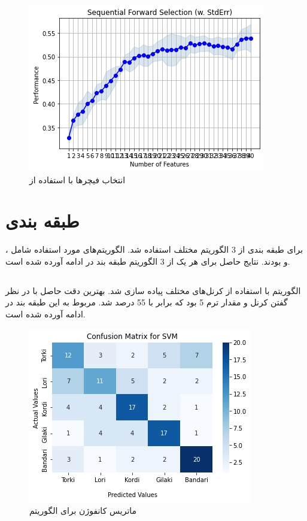 \begin{figure}[h!]
    \centering
    \includegraphics[width=0.75\linewidth]{images/feature_selection.png}
    \caption{انتخاب فیچرها با استفاده از }
    \label{fig:feature_selection}
\end{figure}


\section{طبقه بندی}

برای طبقه بندی از 3 الگوریتم مختلف استفاده شد. الگوریتم‌های مورد استفاده شامل ،  و  بودند.
نتایج حاصل برای هر یک از 3 الگوریتم طبقه بند در ادامه آورده شده است.
\subsection{}
الگوریتم  با استفاده از کرنل‌های مختلف پیاده سازی شد. بهترین دقت حاصل 
با در نظر گفتن کرنل  و مقدار ترم  5 بود که برابر با 55 درصد شد.
 مربوط به این طبقه بند در ادامه آورده شده است.

\begin{figure}[h!]
	\centering
	\includegraphics[width=0.75\linewidth]{images/svm_confusion_matrix.png}
	\caption{ماتریس کانفوژن برای الگوریتم }
	\label{fig:svm_confusion_matrix}
\end{figure}

